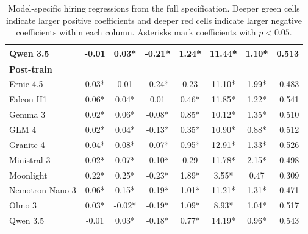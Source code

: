\begin{table}[p]
\begin{tabular}{lccccccr}
Qwen 3.5 & \cellcolor[HTML]{FEF4F3}-0.01 & \cellcolor[HTML]{E7F8EF}0.03* & \cellcolor[HTML]{EA5F50}-0.21* & \cellcolor[HTML]{75D4A3}1.24* & \cellcolor[HTML]{57CB8E}11.44* & \cellcolor[HTML]{9DE1BD}1.10* & 0.513 \\
\midrule
\multicolumn{8}{l}{\textbf{Post-train}} \\
Ernie 4.5 & \cellcolor[HTML]{DFF5EA}0.03* & \cellcolor[HTML]{FBFEFC}0.01 & \cellcolor[HTML]{E74C3C}-0.24* & \cellcolor[HTML]{E6F7EE}0.23 & \cellcolor[HTML]{5CCC92}11.10* & \cellcolor[HTML]{4EC889}1.99* & 0.483 \\
Falcon H1 & \cellcolor[HTML]{C6EDD9}0.06* & \cellcolor[HTML]{DEF5E9}0.04* & \cellcolor[HTML]{F8FDFA}0.01 & \cellcolor[HTML]{CDEFDD}0.46* & \cellcolor[HTML]{50C98A}11.85* & \cellcolor[HTML]{93DDB7}1.22* & 0.541 \\
Gemma 3 & \cellcolor[HTML]{EDFAF3}0.02* & \cellcolor[HTML]{D1F1E0}0.06* & \cellcolor[HTML]{F7C1BC}-0.08* & \cellcolor[HTML]{A1E2C0}0.85* & \cellcolor[HTML]{6AD19B}10.12* & \cellcolor[HTML]{88DAAF}1.35* & 0.510 \\
GLM 4 & \cellcolor[HTML]{EAF9F1}0.02* & \cellcolor[HTML]{DEF5E9}0.04* & \cellcolor[HTML]{F29B92}-0.13* & \cellcolor[HTML]{D8F3E5}0.35* & \cellcolor[HTML]{5ECD93}10.90* & \cellcolor[HTML]{B1E7CB}0.88* & 0.512 \\
Granite 4 & \cellcolor[HTML]{DBF4E7}0.04* & \cellcolor[HTML]{BBEAD1}0.08* & \cellcolor[HTML]{F8CAC6}-0.07* & \cellcolor[HTML]{96DEB9}0.95* & \cellcolor[HTML]{41C480}12.91* & \cellcolor[HTML]{89DAB0}1.33* & 0.526 \\
Ministral 3 & \cellcolor[HTML]{EEFAF3}0.02* & \cellcolor[HTML]{C5EDD8}0.07* & \cellcolor[HTML]{F4B0A9}-0.10* & \cellcolor[HTML]{DFF5E9}0.29 & \cellcolor[HTML]{51C98B}11.78* & \cellcolor[HTML]{40C47F}2.15* & 0.498 \\
Moonlight & \cellcolor[HTML]{2EBE73}0.22* & \cellcolor[HTML]{2EBE73}0.25* & \cellcolor[HTML]{E74F3F}-0.23* & \cellcolor[HTML]{2EBE73}1.89* & \cellcolor[HTML]{CBEFDC}3.55* & \cellcolor[HTML]{D5F2E3}0.47 & 0.309 \\
Nemotron Nano 3 & \cellcolor[HTML]{C9EEDB}0.06* & \cellcolor[HTML]{7FD7A9}0.15* & \cellcolor[HTML]{EC7366}-0.19* & \cellcolor[HTML]{8FDCB4}1.01* & \cellcolor[HTML]{5ACC90}11.21* & \cellcolor[HTML]{8BDBB1}1.31* & 0.471 \\
Olmo 3 & \cellcolor[HTML]{E0F5EB}0.03* & \cellcolor[HTML]{FDF1F0}-0.02* & \cellcolor[HTML]{EC6F62}-0.19* & \cellcolor[HTML]{86D9AE}1.09* & \cellcolor[HTML]{7BD6A7}8.93* & \cellcolor[HTML]{A3E2C1}1.04* & 0.517 \\
Qwen 3.5 & \cellcolor[HTML]{FEF5F4}-0.01 & \cellcolor[HTML]{E6F7EE}0.03* & \cellcolor[HTML]{ED796D}-0.18* & \cellcolor[HTML]{A9E4C6}0.77* & \cellcolor[HTML]{2EBE73}14.19* & \cellcolor[HTML]{AAE5C6}0.96* & 0.543 \\
\hline
\end{tabular}
\caption{Model-specific hiring regressions from the full specification. Deeper green cells indicate larger positive coefficients and deeper red cells indicate larger negative coefficients within each column. Asterisks mark coefficients with $p < 0.05$.}
\label{tab:appendix-model-specific-regressions}
\end{table}
